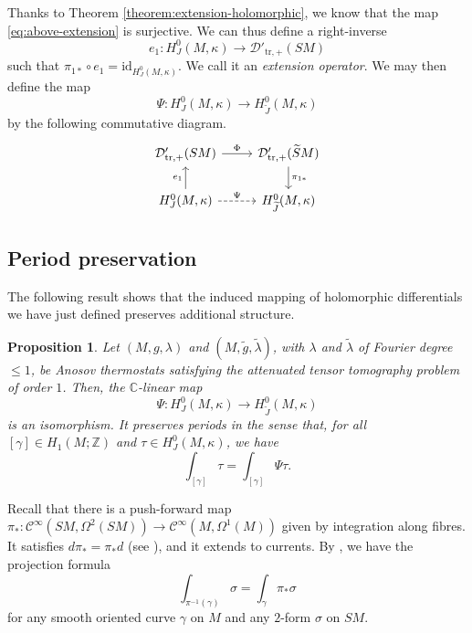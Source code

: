 \documentclass[reqno,12pt,letterpaper]{amsart}
\newtheorem{proposition}{Proposition}[section]
\theoremstyle{definition}
\theoremstyle{remark}
\theoremstyle{definition}
\numberwithin{equation}{section}
\newcommand{\Z}{\mathbb{Z}}
\begin{document}
Thanks to Theorem \ref{theorem:extension-holomorphic}, we know that the map \eqref{eq:above-extension} is surjective. We can thus define a right-inverse
$$e_1:H_J^0(M, \kappa) \to  \mathcal{D}'_{\text{tr},+}(SM)$$
such that $\pi_{1\ast}\circ e_1= \text{id}_{H_J^0(M, \kappa)}$. We call it an \textit{extension operator}. We may then define the map 
\begin{equation*}
\Psi : H^0_{J}(M, \kappa)\to H^0_{\widetilde{J}}(M, \kappa)
\end{equation*}
by the following commutative diagram.
\begin{equation}%
\begin{tikzcd}
\mathcal{D}'_{\text{tr},+}(SM)\arrow[r, "\Phi"] & \mathcal{D}'_{\text{tr},+}(\widetilde{S}M)\arrow[d, "\pi_{1\ast}"]\\
H^0_{J}(M, \kappa)\arrow[u, "e_1"]\arrow[r, "\Psi", dashrightarrow] & H^0_{\widetilde{J}}(M, \kappa)
\end{tikzcd}
\end{equation}
\subsection{Period preservation} The following result shows that the induced mapping of holomorphic differentials we have just defined preserves additional structure. 
\begin{proposition}\label{proposition-last-isomorphism} Let $(M, g, \lambda)$ and $(M, \tilde{g}, \tilde{\lambda})$, with $\lambda$ and $\tilde{\lambda}$ of Fourier degree $\leq 1$, be Anosov thermostats satisfying the attenuated tensor tomography problem of order $1$. Then, the $\mathbb{C}$-linear map 
\begin{equation*}
\Psi : H^0_{J}(M, \kappa)\to H^0_{\widetilde{J}}(M, \kappa)
\end{equation*}%
is an isomorphism. It preserves periods in the sense that, for all $[\gamma]\in H_1(M;\Z)$ and $\tau \in H^0_{J}(M, \kappa)$, we have 
$$\int_{[\gamma]}\tau=\int_{[\gamma]} \Psi \tau.$$
\end{proposition}

Recall that there is a push-forward map $\pi_\ast: \mathcal{C}^\infty(SM, \Omega^2(SM))\to \mathcal{C}^\infty(M, \Omega^1(M))$ given by integration along fibres. It satisfies $d\pi_\ast = \pi_\ast d$ (see \cite[Proposition 6.14]{bott82}), and it extends to currents. By \cite[Proposition 6.15]{bott82}, we have the projection formula
\begin{equation}\label{eq:projection-formula}
\int_{\pi^{-1}(\gamma)}\sigma=\int_{\gamma}\pi_\ast \sigma
\end{equation}
for any smooth oriented curve $\gamma$ on $M$ and any $2$-form $\sigma$ on $SM$. 
\end{document}
